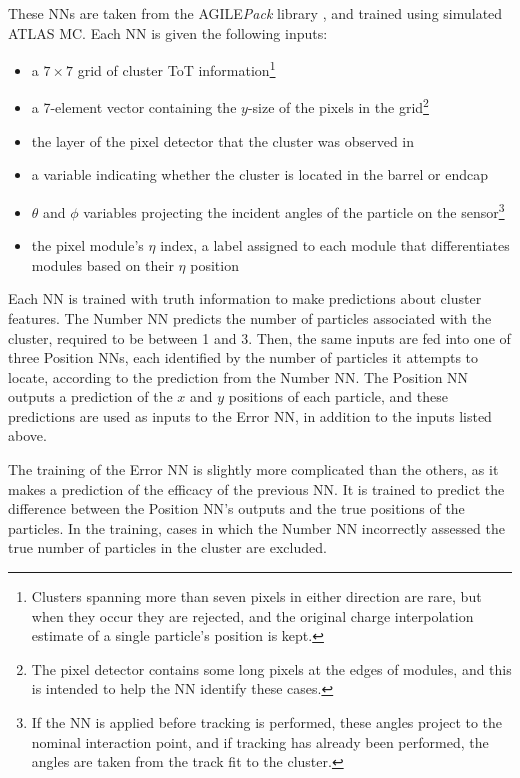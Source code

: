 These \acp{NN} are taken from the AGILE\textit{Pack} library \cite{agile}, and trained using simulated \ac{ATLAS} \ac{MC}. Each \ac{NN} is given the following inputs: 
\begin{itemize}
\item a $7\times7$ grid of cluster \ac{ToT} information\footnote{Clusters spanning more than seven pixels in either direction are rare, but when they occur they are rejected, and the original charge interpolation estimate of a single particle's position is kept.}
\item a 7-element vector containing the $y$-size of the pixels in the grid\footnote{The pixel detector contains some long pixels at the edges of modules, and this is intended to help the \ac{NN} identify these cases.}
\item the layer of the pixel detector that the cluster was observed in
\item a variable indicating whether the cluster is located in the barrel or endcap
\item $\theta$ and $\phi$ variables projecting the incident angles of the particle on the sensor\footnote{If the \ac{NN} is applied before tracking is performed, these angles project to the nominal interaction point, and if tracking has already been performed, the angles are taken from the track fit to the cluster.}
\item the pixel module's $\eta$ index, a label assigned to each module that differentiates modules based on their $\eta$ position
\end{itemize}

Each \ac{NN} is trained with truth information to make predictions about cluster features. The Number \ac{NN} predicts the number of particles associated with the cluster, required to be between 1 and 3. Then, the same inputs are fed into one of three Position \acp{NN}, each identified by the number of particles it attempts to locate, according to the prediction from the Number \ac{NN}. The Position \ac{NN} outputs a prediction of the $x$ and $y$ positions of each particle, and these predictions are used as inputs to the Error \ac{NN}, in addition to the inputs listed above. 

The training of the Error \ac{NN} is slightly more complicated than the others, as it makes a prediction of the efficacy of the previous \ac{NN}. It is trained to predict the difference between the Position \ac{NN}'s outputs and the true positions of the particles. In the training, cases in which the Number \ac{NN} incorrectly assessed the true number of particles in the cluster are excluded.  

